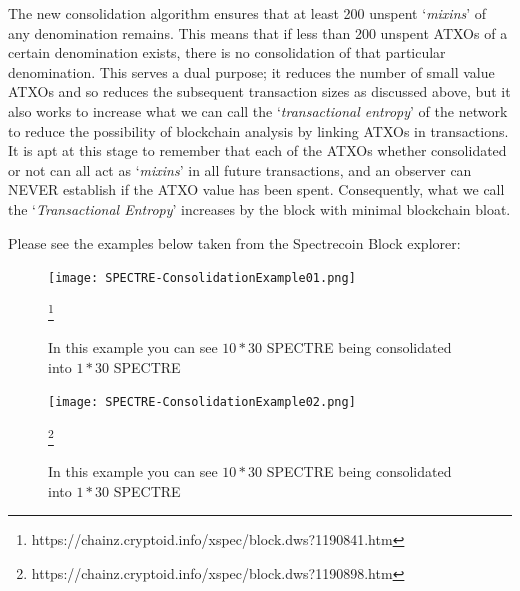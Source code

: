 \noindent
The new consolidation algorithm ensures that at least 200 unspent
‘\textit{mixins}’ of any denomination remains. This means that if less
than 200 unspent ATXOs of a certain denomination exists, there is no
consolidation of that particular denomination. This serves a dual purpose;
it reduces the number of small value ATXOs and so reduces the subsequent
transaction sizes as discussed above, but it also works to increase what
we can call the ‘\textit{transactional entropy}’ of the network to reduce
the possibility of blockchain analysis by linking ATXOs in transactions.
It is apt at this stage to remember that each of the ATXOs whether
consolidated or not can all act as ‘\textit{mixins}’ in all future
transactions, and an observer can NEVER establish if the ATXO value has
been spent. Consequently, what we call the ‘\textit{Transactional Entropy}’
increases by the block with minimal blockchain bloat.
\newpage


\noindent
Please see the examples below taken from the Spectrecoin Block explorer:



\begin{figure}[ht]
	\centering
	\texttt{[image: SPECTRE-ConsolidationExample01.png]}
	\caption{In this example you can see $10 * 30$ SPECTRE being consolidated 
	into $1 * 30$ SPECTRE}
	\footnote{https://chainz.cryptoid.info/xspec/block.dws?1190841.htm}
\end{figure}
\begin{figure}[ht]
	\centering
	\texttt{[image: SPECTRE-ConsolidationExample02.png]}
	\caption{In this example you can see $10 * 30$ SPECTRE being consolidated 
	into $1 * 30$ SPECTRE}
	\footnote{https://chainz.cryptoid.info/xspec/block.dws?1190898.htm}
\end{figure}



